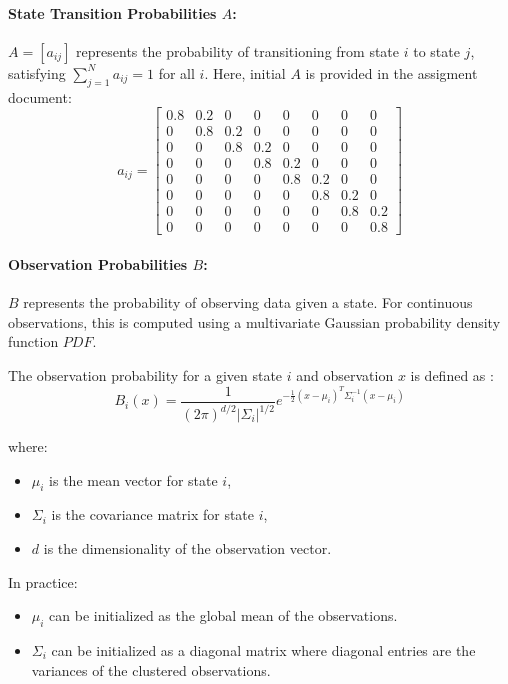 \documentclass{article}
\begin{document}
\paragraph{State Transition Probabilities $A$:}
 $A = [a_{ij}]$  represents the probability of transitioning from state $i$ to state $j$, satisfying $\sum_{j=1}^N a_{ij} = 1$  for all $i$.
Here, initial $A$ is provided in the assigment document:
\begin{equation}
\label{eqn:A}
a_{ij} = \begin{bmatrix}
 	0.8 & 0.2 & 0 & 0 & 0 & 0 & 0 & 0 \\
 	0 & 0.8 & 0.2 & 0 & 0 & 0 & 0 & 0 \\
 	0 & 0 & 0.8 & 0.2 & 0 & 0 & 0 & 0 \\
 	0 & 0 & 0 & 0.8 & 0.2 & 0 & 0 & 0 \\
 	0 & 0 & 0 & 0 & 0.8 & 0.2 & 0 & 0 \\
 	0 & 0 & 0 & 0 & 0 & 0.8 & 0.2 & 0 \\
 	0 & 0 & 0 & 0 & 0 & 0 & 0.8 & 0.2 \\
 	0 & 0 & 0 & 0 & 0 & 0 & 0 & 0.8
 \end{bmatrix}
\end{equation}

\paragraph{Observation Probabilities $B$:}
 $B$ represents the probability of observing data given a state. For continuous observations, this is computed using a multivariate Gaussian probability density function $PDF$.
 
 The observation probability for a given state $i$ and observation $x$ is defined as \citep{EEEM030}:
\begin{equation}
B_i(x) = \frac{1}{(2\pi)^{d/2} |\Sigma_i|^{1/2}} e^{-\frac{1}{2}(x - \mu_i)^T \Sigma_i^{-1} (x - \mu_i)}
\end{equation}

where:
\begin{itemize}
\item $\mu_i$ is the mean vector for state $i$,
\item $\Sigma_i$ is the covariance matrix for state $i$,
\item $d$ is the dimensionality of the observation vector.
\end{itemize}

In practice:
\begin{itemize}
\item $\mu_i$ can be initialized as the global mean of the observations.
\item $\Sigma_i$ can be initialized as a diagonal matrix where diagonal entries are the variances of the clustered observations.
\end{itemize}
\end{document}
